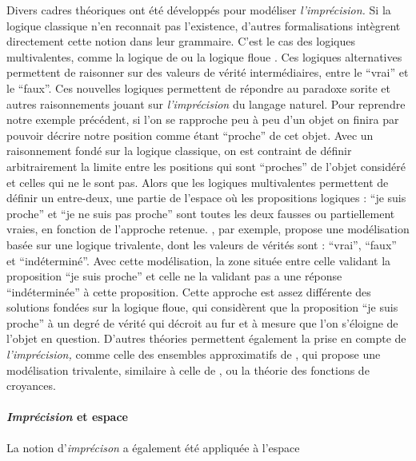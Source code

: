 Divers cadres théoriques ont été développés pour modéliser
\emph{l'imprécision.} Si la logique classique n'en reconnait pas
l'existence, d'autres formalisations intègrent directement cette
notion dans leur grammaire. C'est le cas des logiques multivalentes,
comme la logique de  ou la logique floue
\autocite{Williamson1994,Sorensen2018}. Ces logiques alternatives
permettent de raisonner sur des valeurs de vérité intermédiaires,
entre le \enquote{vrai} et le \enquote{faux}. Ces nouvelles logiques
permettent de répondre au paradoxe sorite et autres raisonnements
jouant sur \emph{l'imprécision} du langage naturel. Pour reprendre
notre exemple précédent, si l'on se rapproche peu à peu d'un objet on
finira par pouvoir décrire notre position comme étant \enquote{proche}
de cet objet. Avec un raisonnement fondé sur la logique classique, on
est contraint de définir arbitrairement la limite entre les positions
qui sont \enquote{proches} de l'objet considéré et celles qui ne le
sont pas. Alors que les logiques multivalentes permettent de définir
un entre-deux, une partie de l'espace où les propositions logiques :
\enquote{je suis proche} et \enquote{je ne suis pas proche} sont
toutes les deux fausses ou partiellement vraies, en fonction de
l'approche retenue. \textcite{Tye1994}, par exemple, propose une
modélisation basée sur une logique trivalente, dont les valeurs de
vérités sont : \enquote{vrai}, \enquote{faux} et
\enquote{indéterminé}. Avec cette modélisation, la zone située entre
celle validant la proposition \enquote{je suis proche} et celle ne la
validant pas a une réponse \enquote{indéterminée} à cette
proposition. Cette approche est assez différente des solutions fondées
sur la logique floue, qui considèrent que la proposition \enquote{je
  suis proche} à un degré de vérité qui décroit au fur et à mesure que
l'on s'éloigne de l'objet en question. D'autres théories permettent
également la prise en compte de \emph{l'imprécision,} comme celle des
ensembles approximatifs de \textcite{Pawlak1982}, qui propose une
modélisation trivalente, similaire à celle de \textcite{Tye1994}
\autocite{Pawlak1997}, ou la théorie des fonctions de croyances.

\paragraph{\emph{Imprécision} et espace}

La notion d'\emph{imprécison} a également été appliquée à l'espace

\autocite{Varzi2001,Varzi2015,Smith2000,Collins2000}

